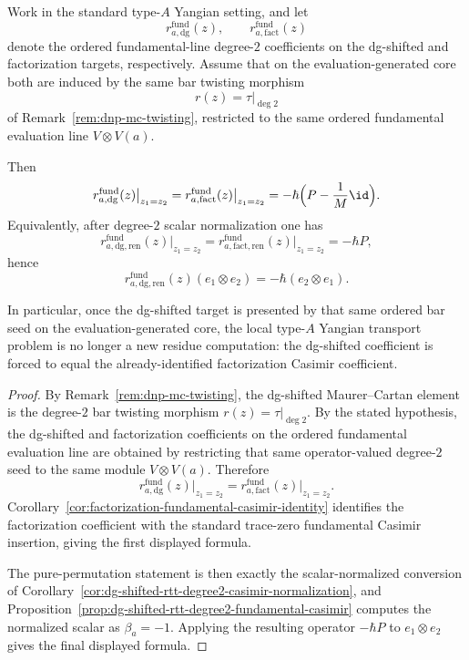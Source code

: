 \begin{proposition}
\label{prop:dg-shifted-factorization-shared-seed}
Work in the standard type-$A$ Yangian setting, and let
\[
r_{a,\mathrm{dg}}^{\mathrm{fund}}(z),
\qquad
r_{a,\mathrm{fact}}^{\mathrm{fund}}(z)
\]
denote the ordered fundamental-line degree-$2$ coefficients on the
dg-shifted and factorization targets, respectively.  Assume that on the
evaluation-generated core both are induced by the same bar twisting
morphism
\[
r(z)=\tau|_{\deg 2}
\]
of Remark~\ref{rem:dnp-mc-twisting}, restricted to the same ordered
fundamental evaluation line $V\otimes V(a)$.

Then
\[
r_{a,\mathrm{dg}}^{\mathrm{fund}}(z)\big|_{z_1=z_2}
=
r_{a,\mathrm{fact}}^{\mathrm{fund}}(z)\big|_{z_1=z_2}
=
-\hbar\Bigl(P-\frac{1}{M}\id\Bigr).
\]
Equivalently, after degree-$2$ scalar normalization one has
\[
r_{a,\mathrm{dg,ren}}^{\mathrm{fund}}(z)\big|_{z_1=z_2}
=
r_{a,\mathrm{fact,ren}}^{\mathrm{fund}}(z)\big|_{z_1=z_2}
=
-\hbar P,
\]
hence
\[
r_{a,\mathrm{dg,ren}}^{\mathrm{fund}}(z)(e_1\otimes e_2)
=
-\hbar(e_2\otimes e_1).
\]

In particular, once the dg-shifted target is presented by that same
ordered bar seed on the evaluation-generated core, the local type-$A$
Yangian transport problem is no longer a new residue computation:
the dg-shifted coefficient is forced to equal the already-identified
factorization Casimir coefficient.
\end{proposition}

\begin{proof}
By Remark~\ref{rem:dnp-mc-twisting}, the dg-shifted Maurer--Cartan
element is the degree-$2$ bar twisting morphism
$r(z)=\tau|_{\deg 2}$.  By the stated hypothesis, the dg-shifted and
factorization coefficients on the ordered fundamental evaluation line
are obtained by restricting that same operator-valued degree-$2$ seed
to the same module $V\otimes V(a)$.  Therefore
\[
r_{a,\mathrm{dg}}^{\mathrm{fund}}(z)\big|_{z_1=z_2}
=
r_{a,\mathrm{fact}}^{\mathrm{fund}}(z)\big|_{z_1=z_2}.
\]
Corollary~\ref{cor:factorization-fundamental-casimir-identity}
identifies the factorization coefficient with the standard trace-zero
fundamental Casimir insertion, giving the first displayed formula.

The pure-permutation statement is then exactly the scalar-normalized
conversion of
Corollary~\ref{cor:dg-shifted-rtt-degree2-casimir-normalization}, and
Proposition~\ref{prop:dg-shifted-rtt-degree2-fundamental-casimir}
computes the normalized scalar as $\beta_a=-1$.  Applying the resulting
operator $-\hbar P$ to $e_1\otimes e_2$ gives the final displayed
formula.
\end{proof}

